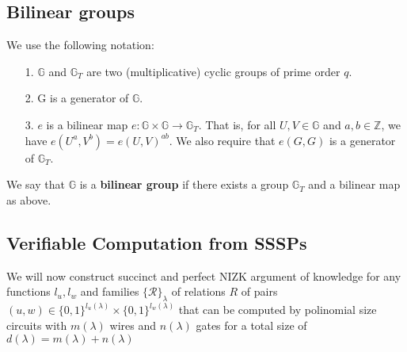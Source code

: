 \documentclass[lnbip]{svmultln}
\begin{document}
\subsection{Bilinear groups}
We use the following notation\cite{boneh2005evaluating}:
\begin{itemize}
	\item[1.] $\mathbb{G}$ and $\mathbb{G}_T$ are two (multiplicative) cyclic groups of prime order $q$.
	\item[2.] G is a generator of $\mathbb{G}$.
	\item[3.] $e$ is a bilinear map $e:\mathbb{G} \times \mathbb{G} \rightarrow \mathbb{G}_T$. That is, for all $U,V \in \mathbb{G}$ and $a,b \in \mathbb{Z}$, we have $e(U^a,V^b)=e(U,V)^{ab}.$ We also require that $e(G,G)$ is a generator of $\mathbb{G}_T$.
\end{itemize}

We say that $\mathbb{G}$ is a \textbf{bilinear group} if there exists a group $\mathbb{G}_T$ and a bilinear
map as above.

\subsection{Verifiable Computation from SSSPs}
We will now construct succinct and perfect NIZK argument of knowledge for any functions $l_u, l_w$ and families $\{\mathcal{R}\}_\lambda$ of relations $R$ of pairs $(u,w) \in \{0,1\}^{l_u(\lambda)} \times \{0,1\}^{l_w(\lambda)} $ that can be computed by polinomial size circuits with $m(\lambda)$ wires and $n(\lambda)$ gates for a total size of $d(\lambda)=m(\lambda)+n(\lambda)$ \\
\end{document}
